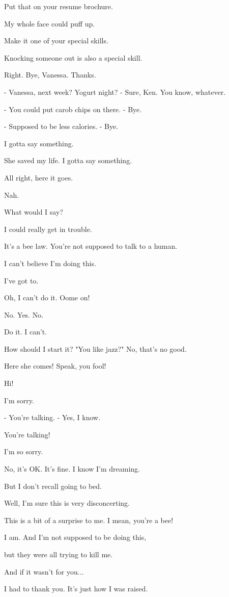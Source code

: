 \documentclass[journal]{IEEEtran}
\begin{document}
  
Put that on your resume brochure.

  
My whole face could puff up.

  
Make it one of your special skills.

  
Knocking someone out
is also a special skill.

  
Right. Bye, Vanessa. Thanks.

  
- Vanessa, next week? Yogurt night?
- Sure, Ken. You know, whatever.

  
- You could put carob chips on there.
- Bye.

  
- Supposed to be less calories.
- Bye.

  
I gotta say something.

  
She saved my life.
I gotta say something.

  
All right, here it goes.

  
Nah.

  
What would I say?

  
I could really get in trouble.

  
It's a bee law.
You're not supposed to talk to a human.

  
I can't believe I'm doing this.

  
I've got to.

  
Oh, I can't do it. Oome on!

  
No. Yes. No.

  
Do it. I can't.

  
How should I start it?
"You like jazz?" No, that's no good.

  
Here she comes! Speak, you fool!

  
Hi!

  
I'm sorry.

  
- You're talking.
- Yes, I know.

  
You're talking!

  
I'm so sorry.

  
No, it's OK. It's fine.
I know I'm dreaming.

  
But I don't recall going to bed.

  
Well, I'm sure this
is very disconcerting.

  
This is a bit of a surprise to me.
I mean, you're a bee!

  
I am. And I'm not supposed
to be doing this,

  
but they were all trying to kill me.

  
And if it wasn't for you...

  
I had to thank you.
It's just how I was raised.
\end{document}
